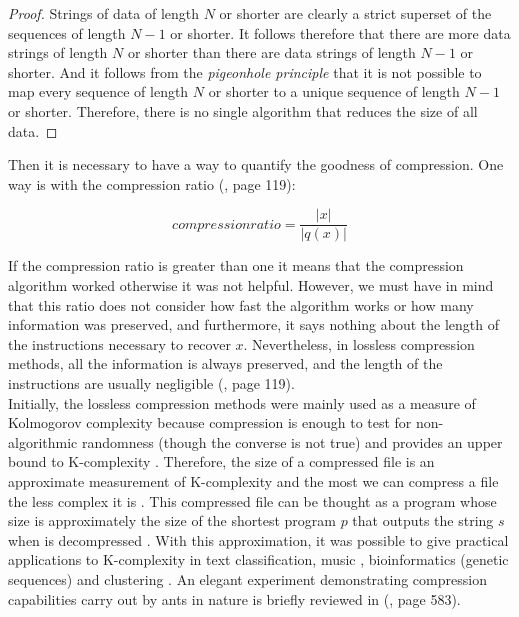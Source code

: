 \begin{proof}
Strings of data of length $N$ or shorter are clearly a strict superset of the sequences of length $N-1$ or shorter. It follows therefore that there are more data strings of length $N$ or shorter than there are data strings of length $N-1$ or shorter. And it follows from the \textit{pigeonhole principle} that it is not possible to map every sequence of length $N$ or shorter to a unique sequence of length $N-1$ or shorter. Therefore, there is no single algorithm that reduces the size of all data.
\end{proof}

Then it is necessary to have a way to quantify the goodness of compression. One way is with the compression ratio (\cite{info_theory}, page 119):

\begin{defn}

\begin{equation}
  compression ratio= \frac{|x|}{|q(x)|}
\end{equation}

\end{defn}

If the compression ratio is greater than one it means that the compression algorithm worked otherwise it was not helpful. However, we must have in mind that this ratio does not consider how fast the algorithm works or how many information was preserved, and furthermore, it says nothing about the length of the instructions necessary to recover $x$. Nevertheless, in lossless compression methods, all the information is always preserved, and the length of the instructions are usually negligible (\cite{info_theory}, page 119). \\

Initially, the lossless compression methods were mainly used as a measure of Kolmogorov complexity because compression is enough to test for non-algorithmic randomness (though the converse is not true) and provides an upper bound to K-complexity \cite{decomposition}. Therefore, the size of a compressed file is an approximate measurement of K-complexity and the most we can compress a file the less complex it is \cite{universos}. This compressed file can be thought as a program whose size is approximately the size of the shortest program $p$ that outputs the string $s$ when is decompressed \cite{faibles_complexites}. With this approximation, it was possible to give practical applications to K-complexity in text classification, music \cite{faibles_complexites}, bioinformatics (genetic sequences) \cite{bio_compression1} \cite{bio_compression2} and clustering \cite{clustering}. An elegant experiment demonstrating compression capabilities carry out by ants in nature is briefly reviewed in (\cite{kolmo_book}, page 583).\\

